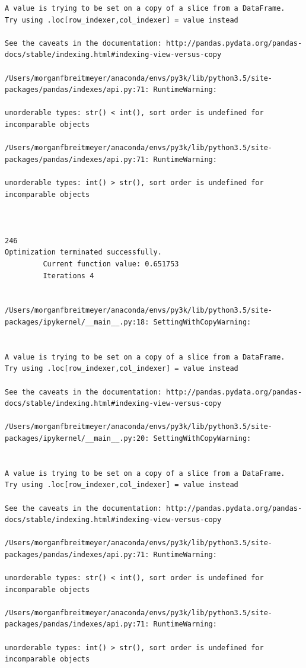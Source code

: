 \begin{lstlisting}
A value is trying to be set on a copy of a slice from a DataFrame.
Try using .loc[row_indexer,col_indexer] = value instead

See the caveats in the documentation: http://pandas.pydata.org/pandas-docs/stable/indexing.html#indexing-view-versus-copy

/Users/morganfbreitmeyer/anaconda/envs/py3k/lib/python3.5/site-packages/pandas/indexes/api.py:71: RuntimeWarning:

unorderable types: str() < int(), sort order is undefined for incomparable objects

/Users/morganfbreitmeyer/anaconda/envs/py3k/lib/python3.5/site-packages/pandas/indexes/api.py:71: RuntimeWarning:

unorderable types: int() > str(), sort order is undefined for incomparable objects



246
Optimization terminated successfully.
         Current function value: 0.651753
         Iterations 4


/Users/morganfbreitmeyer/anaconda/envs/py3k/lib/python3.5/site-packages/ipykernel/__main__.py:18: SettingWithCopyWarning:


A value is trying to be set on a copy of a slice from a DataFrame.
Try using .loc[row_indexer,col_indexer] = value instead

See the caveats in the documentation: http://pandas.pydata.org/pandas-docs/stable/indexing.html#indexing-view-versus-copy

/Users/morganfbreitmeyer/anaconda/envs/py3k/lib/python3.5/site-packages/ipykernel/__main__.py:20: SettingWithCopyWarning:


A value is trying to be set on a copy of a slice from a DataFrame.
Try using .loc[row_indexer,col_indexer] = value instead

See the caveats in the documentation: http://pandas.pydata.org/pandas-docs/stable/indexing.html#indexing-view-versus-copy

/Users/morganfbreitmeyer/anaconda/envs/py3k/lib/python3.5/site-packages/pandas/indexes/api.py:71: RuntimeWarning:

unorderable types: str() < int(), sort order is undefined for incomparable objects

/Users/morganfbreitmeyer/anaconda/envs/py3k/lib/python3.5/site-packages/pandas/indexes/api.py:71: RuntimeWarning:

unorderable types: int() > str(), sort order is undefined for incomparable objects




\end{lstlisting}
